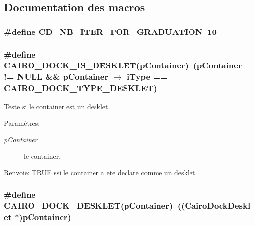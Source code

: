 \subsection{Documentation des macros}
\subsubsection{\setlength{\rightskip}{0pt plus 5cm}\#define CD\_\-NB\_\-ITER\_\-FOR\_\-GRADUATION~10}\label{cairo-dock-desklet_8h_eed859d634690122c790c64427c9e2a5}


\subsubsection{\setlength{\rightskip}{0pt plus 5cm}\#define CAIRO\_\-DOCK\_\-IS\_\-DESKLET(pContainer)~(pContainer != NULL \&\& pContainer $\rightarrow$ iType == CAIRO\_\-DOCK\_\-TYPE\_\-DESKLET)}\label{cairo-dock-desklet_8h_7d23b2629d7a93bc61bd65366d78fd9e}


Teste si le container est un desklet. \begin{Desc}
\item[Paramètres:]
\begin{description}
\item[{\em pContainer}]le container. \end{description}
\end{Desc}
\begin{Desc}
\item[Renvoie:]TRUE ssi le container a ete declare comme un desklet. \end{Desc}
\subsubsection{\setlength{\rightskip}{0pt plus 5cm}\#define CAIRO\_\-DOCK\_\-DESKLET(pContainer)~(({\bf CairoDockDesklet} $\ast$)pContainer)}\label{cairo-dock-desklet_8h_2565e6cfafd6e1cfe34a9591766a888a}


